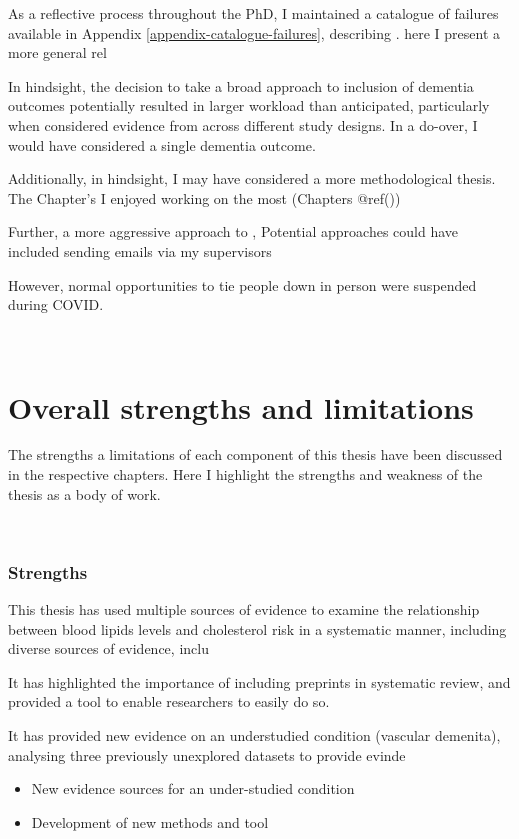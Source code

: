 \documentclass[a4paper, twoside]{templates/ociamthesis}
\providecommand{\tightlist}{%
  \setlength{\itemsep}{0pt}\setlength{\parskip}{0pt}}
\begin{document}
As a reflective process throughout the PhD, I maintained a catalogue of failures available in Appendix \ref{appendix-catalogue-failures}, describing . here I present a more general rel

In hindsight, the decision to take a broad approach to inclusion of dementia outcomes potentially resulted in larger workload than anticipated, particularly when considered evidence from across different study designs. In a do-over, I would have considered a single dementia outcome.

Additionally, in hindsight, I may have considered a more methodological thesis. The Chapter's I enjoyed working on the most (Chapters @ref())

Further, a more aggressive approach to , Potential approaches could have included sending emails via my supervisors

However, normal opportunities to tie people down in person were suspended during COVID.

~

\hypertarget{overall-strengths-and-limitations}{%
\section{Overall strengths and limitations}\label{overall-strengths-and-limitations}}

The strengths a limitations of each component of this thesis have been discussed in the respective chapters. Here I highlight the strengths and weakness of the thesis as a body of work.

~

\hypertarget{strengths-3}{%
\subsubsection{Strengths}\label{strengths-3}}

This thesis has used multiple sources of evidence to examine the relationship between blood lipids levels and cholesterol risk in a systematic manner, including diverse sources of evidence, inclu

It has highlighted the importance of including preprints in systematic review, and provided a tool to enable researchers to easily do so.

It has provided new evidence on an understudied condition (vascular demenita), analysing three previously unexplored datasets to provide evinde

\begin{itemize}
\tightlist
\item
  New evidence sources for an under-studied condition
\item
  Development of new methods and tool
\end{itemize}
\end{document}
